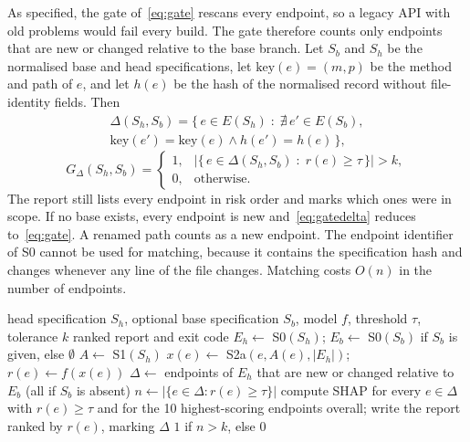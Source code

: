 \documentclass[conference]{IEEEtran}
\begin{document}
As specified, the gate of~\eqref{eq:gate} rescans every endpoint, so a legacy API with old
problems would fail every build. The gate therefore counts only endpoints that are new or
changed relative to the base branch. Let $S_b$ and $S_h$ be the normalised base and head
specifications, let $\mathrm{key}(e)=(m,p)$ be the method and path of $e$, and let $h(e)$ be the hash
of the normalised record without file-identity fields. Then
\begin{multline}
\Delta(S_h,S_b)=\bigl\{\,e\in E(S_h)\;:\;\nexists\,e'\in E(S_b),\\
\mathrm{key}(e')=\mathrm{key}(e)\wedge h(e')=h(e)\,\bigr\},
\label{eq:delta}
\end{multline}
\begin{equation}
G_{\Delta}(S_h,S_b)=
\begin{cases}
1, & \bigl|\{\,e\in\Delta(S_h,S_b)\;:\;r(e)\ge\tau\,\}\bigr|>k,\\
0, & \text{otherwise.}
\end{cases}
\label{eq:gatedelta}
\end{equation}
The report still lists every endpoint in risk order and marks which ones were in scope. If no
base exists, every endpoint is new and~\eqref{eq:gatedelta} reduces to~\eqref{eq:gate}. A renamed path counts as a new endpoint. The endpoint
identifier of S0 cannot be used for matching, because it contains the specification hash and
changes whenever any line of the file changes. Matching costs $O(n)$ in the number of
endpoints.

\begin{algorithm}[!t]
\caption{Runtime scan with changed-endpoint gate (S0--S3)}
\label{alg:scan}
\footnotesize
\begin{algorithmic}[1]
\REQUIRE head specification $S_h$, optional base specification $S_b$, model $f$, threshold $\tau$, tolerance $k$
\ENSURE ranked report and exit code
\STATE $E_h\leftarrow$ S0$(S_h)$;\; $E_b\leftarrow$ S0$(S_b)$ if $S_b$ is given, else $\emptyset$
\STATE $A\leftarrow$ S1$(S_h)$ 
  \STATE $x(e)\leftarrow$ S2a$(e,A(e),|E_h|)$;\; $r(e)\leftarrow f(x(e))$
\ENDFOR
\STATE $\Delta\leftarrow$ endpoints of $E_h$ that are new or changed relative to $E_b$ (all if $S_b$ is absent)
\STATE $n\leftarrow|\{e\in\Delta : r(e)\ge\tau\}|$
\STATE compute SHAP for every $e\in\Delta$ with $r(e)\ge\tau$ and for the 10 highest-scoring endpoints overall; write the report ranked by $r(e)$, marking $\Delta$
\RETURN $1$ if $n>k$, else $0$
\end{algorithmic}
\end{algorithm}
\end{document}
